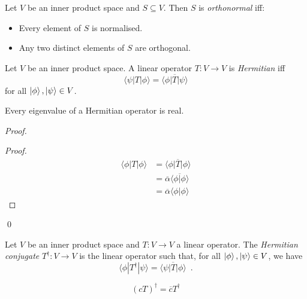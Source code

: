 \begin{df}[Orthonormal]
Let $V$ be an inner product space and $S \subseteq V$. Then $S$ is \emph{orthonormal} iff:
\begin{itemize}
\item Every element of $S$ is normalised.
\item Any two distinct elements of $S$ are orthogonal.
\end{itemize}
\end{df}

\begin{df}[Hermitian]
Let $V$ be an inner product space. A linear operator $T : V \rightarrow V$ is \emph{Hermitian} iff
\[ \langle \psi | T | \phi \rangle = \overline{\langle \phi | T | \psi \rangle} \]
for all $\left| {\phi} \right\rangle, \left| {\psi} \right\rangle \in V$.
\end{df}

\begin{prop}
Every eigenvalue of a Hermitian operator is real.
\end{prop}

\begin{proof}
\pf
{}
\begin{proof}
	\pf
	\begin{align*}
		\langle \phi | T | \phi \rangle & = \overline{\langle \phi | T | \phi \rangle} \\
		& = \overline{\alpha} \overline{\langle \phi | \phi \rangle} \\
		& = \overline{\alpha} \langle \phi | \phi \rangle
	\end{align*}
\end{proof}
\qed
\end{proof}

\begin{df}
Let $V$ be an inner product space and $T : V \rightarrow V$ a linear operator. The \emph{Hermitian conjugate} $T^\dagger : V \rightarrow V$ is the linear operator such that, for all $\left| {\phi} \right\rangle, \left| {\psi} \right\rangle \in V$, we have
\[ \langle \phi | T^\dagger | \psi \rangle = \overline{\langle \psi | T | \phi \rangle} \enspace . \]
\end{df}

\begin{prop}
\[ (cT)^\dagger = \overline{c} T^\dagger \]
\end{prop}


